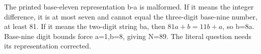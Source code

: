 The printed base-eleven representation b-a is malformed. If it means the integer difference, it is at most seven and cannot equal the three-digit base-nine number, at least 81. If it means the two-digit string ba, then $81a+b=11b+a$, so b=8a. Base-nine digit bounds force a=1,b=8, giving N=89. The literal question needs its representation corrected.
